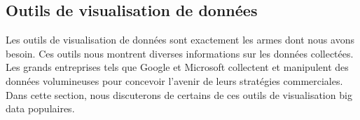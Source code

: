 \documentclass[french, a4paper, 12pt]{report}
\begin{document}


\subsection{Outils de visualisation de données }
Les outils de visualisation de données sont exactement les armes dont nous avons besoin. Ces outils nous montrent diverses informations sur les données collectées. Les grands entreprises tels que Google et Microsoft collectent et manipulent des données volumineuses pour concevoir l'avenir de leurs stratégies commerciales. Dans cette section, nous discuterons de certains de ces outils de visualisation big data populaires.\\
\end{document}
